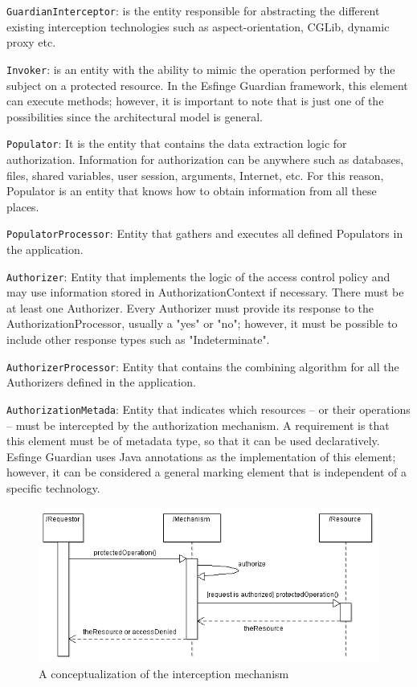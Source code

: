 \documentclass[sigconf]{acmart}
\begin{document}
\noindent \verb|GuardianInterceptor|: is the entity responsible for abstracting the different existing interception technologies such as aspect-orientation, CGLib, dynamic proxy etc.


\noindent \verb|Invoker|: is an entity with the ability to mimic the operation performed by the subject on a protected resource. In the Esfinge Guardian framework, this element can execute methods; however, it is important to note that is just one of the possibilities since the architectural model is general.


\noindent \verb|Populator|: It is the entity that contains the data extraction logic for authorization. Information for authorization can be anywhere such as databases, files, shared variables, user session, arguments, Internet, etc. For this reason, Populator is an entity that knows how to obtain information from all these places.


\noindent \verb|PopulatorProcessor|: Entity that gathers and executes all defined Populators in the application.


\noindent \verb|Authorizer|: Entity that implements the logic of the access control policy and may use information stored in AuthorizationContext if necessary. There must be at least one Authorizer. Every Authorizer must provide its response to the AuthorizationProcessor, usually a "yes" or "no"; however, it must be possible to include other response types such as "Indeterminate".


\noindent \verb|AuthorizerProcessor|: Entity that contains the combining algorithm for all the Authorizers defined in the application.


\noindent \verb|AuthorizationMetada|: Entity that indicates which resources – or their operations – must be intercepted by the authorization mechanism. A requirement is that this element must be of metadata type, so that it can be used declaratively. Esfinge Guardian uses Java annotations as the implementation of this element; however, it can be considered a general marking element that is independent of a specific technology.

\begin{figure}
  \centering
  \includegraphics[scale=0.5]{img/interception-mechanism.png}
  \caption{A conceptualization of the interception mechanism \cite{Silva2013}}
  \label{fig:interception-mechanism}
\end{figure}
\end{document}

